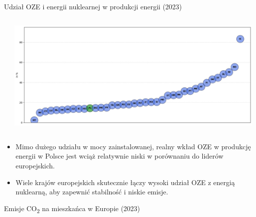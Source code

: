 \begin{frame}{Udział OZE i energii nuklearnej w produkcji energii (2023)}
    \begin{columns}[T]
        \begin{column}{0.5\textwidth}
        \end{column}

        \begin{column}{0.5\textwidth}
            \includegraphics[width=\textwidth]{images/ozePercentageShare.png}
        \end{column}
    \end{columns}
    \begin{itemize}
        \item \small {} Mimo dużego udziału w mocy zainstalowanej, realny wkład OZE w produkcję energii w Polsce jest wciąż relatywnie niski w porównaniu do liderów europejskich.
        \item \small {} Wiele krajów europejskich skutecznie łączy wysoki udział OZE z energią nuklearną, aby zapewnić stabilność i niskie emisje.
    \end{itemize}
\end{frame}

\begin{frame}{Emisje CO\textsubscript{2} na mieszkańca w Europie (2023)}
\end{frame}

